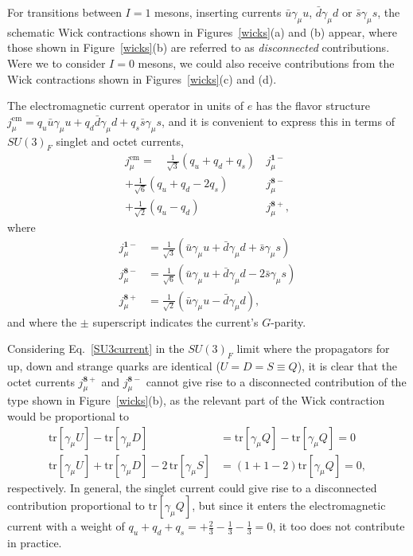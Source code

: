 \documentclass[twocolumn,amsmath,amssymb,prd,10pt,floatfix, 
superscriptaddress,nofootinbib, showpacs, preprintnumbers]{revtex4-1}
\begin{document}
For transitions between $I=1$ mesons, inserting currents $\bar{u} \gamma_\mu u$, $\bar{d} \gamma_\mu d$ or $\bar{s} \gamma_\mu s$, the schematic Wick contractions shown in Figures~\ref{wicks}(a) and (b) appear, where those shown in Figure~\ref{wicks}(b) are referred to as \emph{disconnected} contributions. Were we to consider $I=0$ mesons, we could also receive contributions from the Wick contractions shown in Figures~\ref{wicks}(c) and (d).


The electromagnetic current operator in units of $e$ has the flavor structure ${j^\mathrm{em}_\mu = q_u \bar{u} \gamma_\mu u + q_d \bar{d} \gamma_\mu d + q_s \bar{s} \gamma_\mu s}$, and it is convenient to express this in terms of $SU(3)_F$ singlet and octet currents,
\begin{align}
j^\mathrm{em}_\mu = \quad \tfrac{1}{\sqrt{3}} (q_u + q_d + q_s)\, &j^{\mathbf{1}-}_\mu \nonumber \\
					+\tfrac{1}{\sqrt{6}} (q_u + q_d - 2q_s)\, &j^{\mathbf{8}-}_\mu \nonumber \\
					+\tfrac{1}{\sqrt{2}} (q_u - q_d)\, &j^{\mathbf{8}+}_\mu,
\end{align}
where
\begin{align}
	j^{\mathbf{1}-}_\mu &= \tfrac{1}{\sqrt{3}}\left( \bar{u} \gamma_\mu u + \bar{d} \gamma_\mu d   + \bar{s} \gamma_\mu s\right) \nonumber\\
	j^{\mathbf{8}-}_\mu &= \tfrac{1}{\sqrt{6}}\left( \bar{u} \gamma_\mu u + \bar{d} \gamma_\mu d  -2 \bar{s} \gamma_\mu s\right) \nonumber \\
	j^{\mathbf{8}+}_\mu &= \tfrac{1}{\sqrt{2}}\left( \bar{u} \gamma_\mu u - \bar{d} \gamma_\mu d  \right), \label{SU3current} 
\end{align}
and where the $\pm$ superscript indicates the current's \mbox{$G$-parity}.


Considering Eq.~\ref{SU3current} in the $SU(3)_F$ limit where the propagators for up, down and strange quarks are identical ($U=D=S\equiv Q$), it is clear that the octet currents $j^{\mathbf{8}+}_\mu$ and $j^{\mathbf{8}-}_\mu$ cannot give rise to a disconnected contribution of the type shown in Figure~\ref{wicks}(b), as the relevant part of the Wick contraction would be proportional to 
\begin{align*}
\mathrm{tr}\left[\gamma_\mu U \right] - \mathrm{tr}\left[\gamma_\mu D \right] &=\mathrm{tr}\left[\gamma_\mu Q \right] - \mathrm{tr}\left[\gamma_\mu Q \right] = 0 \nonumber \\
\mathrm{tr}\left[\gamma_\mu U \right] + \mathrm{tr}\left[\gamma_\mu D \right] - 2\, \mathrm{tr}\left[\gamma_\mu S \right] &=(1+1-2)\mathrm{tr}\left[\gamma_\mu Q \right] = 0,
\end{align*}
respectively. In general, the singlet current could give rise to a disconnected contribution proportional to $\mathrm{tr}\left[\gamma_\mu Q \right]$, but since it enters the electromagnetic current with a weight of $q_u + q_d + q_s = +\tfrac{2}{3} - \tfrac{1}{3} - \tfrac{1}{3} = 0$, it too does not contribute in practice.
\end{document}
